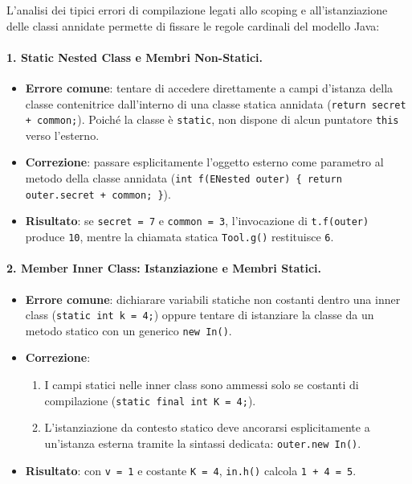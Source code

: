 \documentclass[12pt]{extarticle}
\begin{document}
\noindent L'analisi dei tipici errori di compilazione legati allo scoping e all'istanziazione delle classi annidate permette di fissare le regole cardinali del modello Java:

\paragraph{1. Static Nested Class e Membri Non-Statici.}
\begin{itemize}
    \item \textbf{Errore comune}: tentare di accedere direttamente a campi d'istanza della classe contenitrice dall'interno di una classe statica annidata (\texttt{return secret + common;}). Poiché la classe è \texttt{static}, non dispone di alcun puntatore \texttt{this} verso l'esterno.
    \item \textbf{Correzione}: passare esplicitamente l'oggetto esterno come parametro al metodo della classe annidata (\texttt{int f(ENested outer) \{ return outer.secret + common; \}}).
    \item \textbf{Risultato}: se \texttt{secret = 7} e \texttt{common = 3}, l'invocazione di \texttt{t.f(outer)} produce \texttt{10}, mentre la chiamata statica \texttt{Tool.g()} restituisce \texttt{6}.
\end{itemize}

\paragraph{2. Member Inner Class: Istanziazione e Membri Statici.}
\begin{itemize}
    \item \textbf{Errore comune}: dichiarare variabili statiche non costanti dentro una inner class (\texttt{static int k = 4;}) oppure tentare di istanziare la classe da un metodo statico con un generico \texttt{new In()}.
    \item \textbf{Correzione}:
    \begin{enumerate}
        \item I campi statici nelle inner class sono ammessi solo se costanti di compilazione (\texttt{static final int K = 4;}).
        \item L'istanziazione da contesto statico deve ancorarsi esplicitamente a un'istanza esterna tramite la sintassi dedicata: \texttt{outer.new In()}.
    \end{enumerate}
    \item \textbf{Risultato}: con \texttt{v = 1} e costante \texttt{K = 4}, \texttt{in.h()} calcola \texttt{1 + 4 = 5}.
\end{itemize}
\end{document}

